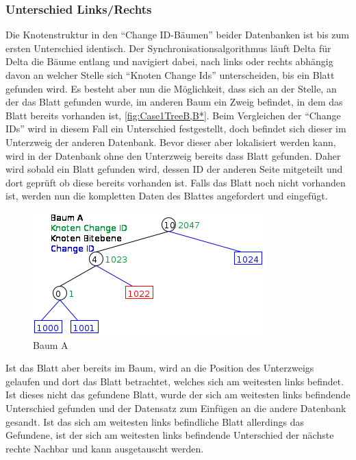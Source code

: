 \documentclass[a4paper,11pt,oneside,%
headsepline,												%
footsepline,												%
bibtotocnumbered									%
]{scrreprt}
\begin{document}
\subsubsection{Unterschied Links/Rechts}
\label{sssec:SynchroDiffLeftOrRight}
Die Knotenstruktur in den \enquote{Change ID-Bäumen} beider Datenbanken ist bis zum ersten Unterschied identisch. Der Synchronisationsalgorithmus läuft Delta für Delta die Bäume entlang und navigiert dabei, nach links oder rechts abhängig davon an welcher Stelle sich \enquote{Knoten Change Ids} unterscheiden, bis ein Blatt gefunden wird. Es besteht aber nun die Möglichkeit, dass sich an der Stelle, an der das Blatt gefunden wurde, im anderen Baum ein Zweig befindet, in dem das Blatt bereits vorhanden ist, \autoref{fig:Case1TreeB,B*}. Beim Vergleichen der \enquote{Change IDs} wird in diesem Fall ein Unterschied festgestellt, doch befindet sich dieser im Unterzweig der anderen Datenbank. Bevor dieser aber lokalisiert werden kann, wird in der Datenbank ohne den Unterzweig bereits dass Blatt gefunden. Daher wird sobald ein Blatt gefunden wird, dessen ID der anderen Seite mitgeteilt und dort geprüft ob diese bereits vorhanden ist. Falls das Blatt noch nicht vorhanden ist, werden nun die kompletten Daten des Blattes angefordert und eingefügt.\begin{figure}
  \begin{center}
    \includegraphics[width=0.9\linewidth]{bilder/Case1TreeA.png}
  \end{center}
 \caption{Baum A}
 \label{fig:Case1TreeA}
\end{figure} Ist das Blatt aber bereits im Baum, wird an die Position des Unterzweigs gelaufen und dort das Blatt betrachtet, welches sich am weitesten links befindet. Ist dieses nicht das gefundene Blatt, wurde der sich am weitesten links befindende Unterschied gefunden und der Datensatz zum Einfügen an die andere Datenbank gesandt. Ist das sich am weitesten links befindliche Blatt allerdings das Gefundene, ist der sich am weitesten links befindende Unterschied der nächste rechte Nachbar und kann ausgetauscht werden.
\end{document}
